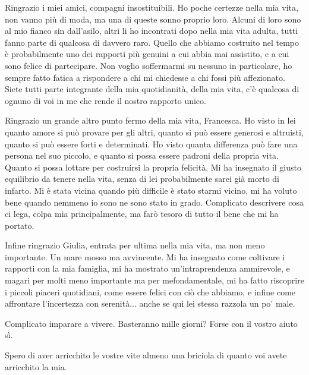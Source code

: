 \documentclass[11pt,a4paper]{article}
\begin{document}
Ringrazio i miei amici, compagni insostituibili. Ho poche certezze nella mia vita, non vanno più di moda, ma una di queste sonno proprio loro. Alcuni di loro sono al mio fianco sin dall'asilo, altri li ho incontrati dopo nella mia vita adulta, tutti fanno parte di qualcosa di davvero raro. Quello che abbiamo costruito nel tempo è probabilmente uno dei rapporti più genuini a cui abbia mai assistito, e a cui sono felice di partecipare. Non voglio soffermarmi su nessuno in particolare, ho sempre fatto fatica a rispondere a chi mi chiedesse a chi fossi più affezionato. Siete tutti parte integrante della mia quotidianità, della mia vita, c'è qualcosa di ognuno di voi in me che rende il nostro rapporto unico.

Ringrazio un grande altro punto fermo della mia vita, Francesca. Ho visto in lei quanto amore si può provare per gli altri, quanto si può essere generosi e altruisti, quanto si può essere forti e determinati. Ho visto quanta differenza può fare una persona nel suo piccolo, e quanto si possa essere padroni della propria vita. Quanto si possa lottare per costruirsi la propria felicità. Mi ha insegnato il giusto equilibrio da tenere nella vita, senza di lei probabilmente sarei già morto di infarto. Mi è stata vicina quando più difficile è stato starmi vicino, mi ha voluto bene quando nemmeno io sono ne sono stato in grado. Complicato descrivere cosa ci lega, colpa mia principalmente, ma farò tesoro di tutto il bene che mi ha portato.

Infine ringrazio Giulia, entrata per ultima nella mia vita, ma non meno importante. Un mare mosso ma avvincente. Mi ha insegnato come coltivare i rapporti con la mia famiglia, mi ha mostrato un'intraprendenza ammirevole, e magari per molti meno importante ma per mefondamentale, mi ha fatto riscoprire i piccoli piaceri quotidiani, come essere felici con ciò che abbiamo, e infine come affrontare l'incertezza con serenità... anche se qui lei stessa razzola un po' male.

\vspace{\baselineskip}

Complicato imparare a vivere. Basteranno mille giorni? Forse con il vostro aiuto sì.

Spero di aver arricchito le vostre vite almeno una briciola di quanto voi avete arricchito la mia.

\end{document}
